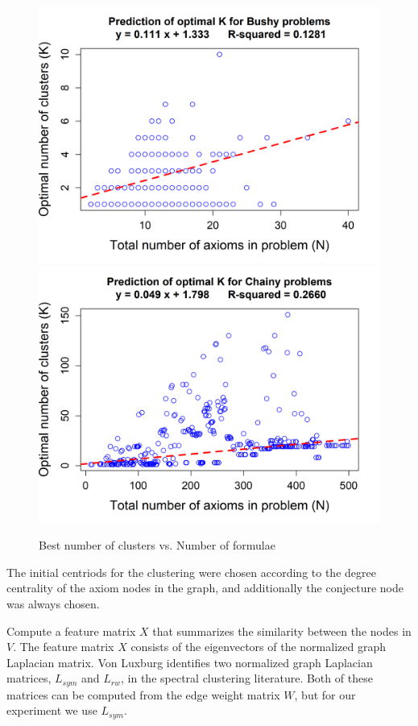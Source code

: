 \documentclass[EPiC]{easychair}
\begin{document}
\begin{figure}[H]
\centering
\includegraphics[scale=0.42]{median-regression-optimal-k-bushy.png}
\includegraphics[scale=0.42]{median-regression-optimal-k-chainy.png}
\vspace{1mm}
\caption{Best number of clusters vs. Number of formulae}
\label{fig:median-regression}
\end{figure}

The initial centriods for the clustering were chosen according to the degree 
centrality of the axiom nodes in the graph, and additionally the conjecture 
node was always chosen.

Compute a feature matrix $X$ that summarizes the similarity between 
      the nodes in $V$.
The feature matrix $X$ consists of the eigenvectors of the normalized 
graph Laplacian matrix. Von Luxburg \cite{vLu07} identifies two normalized 
graph Laplacian matrices, $L_{sym}$ and $L_{rw}$, in the spectral clustering 
literature. Both of these matrices can be computed from the edge weight matrix 
$W$, but for our experiment we use $L_{sym}$.
\end{document}
